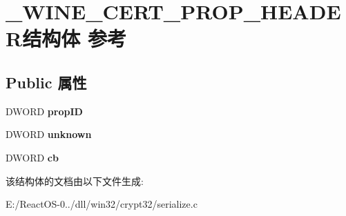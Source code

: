 \hypertarget{struct___w_i_n_e___c_e_r_t___p_r_o_p___h_e_a_d_e_r}{}\section{\+\_\+\+W\+I\+N\+E\+\_\+\+C\+E\+R\+T\+\_\+\+P\+R\+O\+P\+\_\+\+H\+E\+A\+D\+E\+R结构体 参考}
\label{struct___w_i_n_e___c_e_r_t___p_r_o_p___h_e_a_d_e_r}
\subsection*{Public 属性}
\begin{DoxyCompactItemize}
\item 
\mbox{\label{struct___w_i_n_e___c_e_r_t___p_r_o_p___h_e_a_d_e_r_aac0157e9cc19ba95aefcd21f84d56691}} 
D\+W\+O\+RD {\bfseries prop\+ID}
\item 
\mbox{\label{struct___w_i_n_e___c_e_r_t___p_r_o_p___h_e_a_d_e_r_ab89c70b5e4d9619f309b95c18d151662}} 
D\+W\+O\+RD {\bfseries unknown}
\item 
\mbox{\label{struct___w_i_n_e___c_e_r_t___p_r_o_p___h_e_a_d_e_r_a5456efb5a3846ecc8c63f88fdfe1dca0}} 
D\+W\+O\+RD {\bfseries cb}
\end{DoxyCompactItemize}


该结构体的文档由以下文件生成\+:\begin{DoxyCompactItemize}
\item 
E\+:/\+React\+O\+S-\/0../dll/win32/crypt32/serialize.\+c\end{DoxyCompactItemize}
